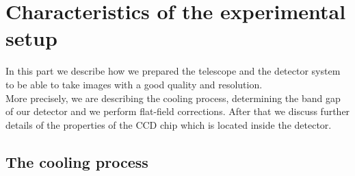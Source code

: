 \chapter{Characteristics of the experimental setup}
In this part we describe how we prepared the telescope and the detector system to be able to take images with a good quality and resolution. \\
More precisely, we are describing the cooling process, determining the band gap of our detector and we perform flat-field corrections. After that we discuss further details of the properties of the CCD chip which is located inside the detector. 

\section{The cooling process}

